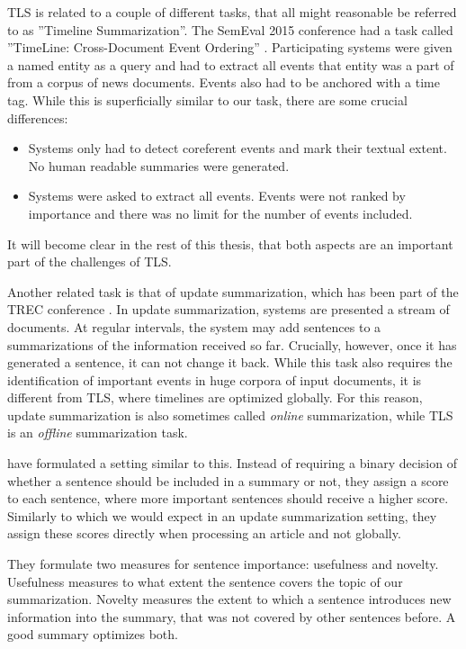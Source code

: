 \documentclass[a4paper,BCOR=10mm]{report}
\numberwithin{lemma}{chapter}
\numberwithin{definition}{chapter}
\begin{document}

TLS is related to a couple of different tasks, that all might reasonable be referred to as ''Timeline Summarization''.
The SemEval 2015 conference had a task called ''TimeLine: Cross-Document Event Ordering'' \citep{semeval-timeline}. Participating systems were given a named entity as a query and had to extract all events that entity was a part of from a corpus of news documents. Events also had to be anchored with a time tag.
While this is superficially similar to our task, there are some crucial differences:

\begin{itemize}
    \item{Systems only had to detect coreferent events and mark their textual extent. No human readable summaries were generated. }
    \item{Systems were asked to extract all events. Events were not ranked by importance and there was no limit for the number of events included. }
\end{itemize}

It will become clear in the rest of this thesis, that both aspects are an important part of the challenges of TLS.

Another related task is that of update summarization, which has been part of the TREC conference \citep{trec-update}.
In update summarization, systems are presented a stream of documents.
At regular intervals, the system may add sentences to a summarizations of the information received so far.
Crucially, however, once it has generated a sentence, it can not change it back.
While this task also requires the identification of important events in huge corpora of input documents, it is different from TLS, where timelines are optimized globally. For this reason, update summarization is also sometimes called \textit{online} summarization, while TLS is an \textit{offline} summarization task.

\citet{swan+allen-temporal-summaries} have formulated a setting similar to this. Instead of requiring a binary decision of whether a sentence should be included in a summary or not, they assign a score to each sentence, where more important sentences should receive a higher score. Similarly to which we would expect in an update summarization setting, they assign these scores directly when processing an article and not globally.

They formulate two measures for sentence importance: usefulness and novelty.
Usefulness measures to what extent the sentence covers the topic of our summarization. Novelty measures the extent to which a sentence introduces new information into the summary, that was not covered by other sentences before.
A good summary optimizes both.
\end{document}
